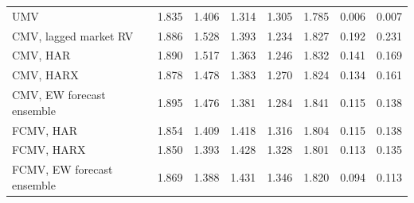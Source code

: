 \begin{table}[htbp]
\begin{tabular}{lrrrrrrr}
\hline
UMV & 1.835 & 1.406 & 1.314 & 1.305 & 1.785 & 0.006 & 0.007 \\
CMV, lagged market RV & 1.886 & 1.528 & 1.393 & 1.234 & 1.827 & 0.192 & 0.231 \\
CMV, HAR & 1.890 & 1.517 & 1.363 & 1.246 & 1.832 & 0.141 & 0.169 \\
CMV, HARX & 1.878 & 1.478 & 1.383 & 1.270 & 1.824 & 0.134 & 0.161 \\
CMV, EW forecast ensemble & 1.895 & 1.476 & 1.381 & 1.284 & 1.841 & 0.115 & 0.138 \\
FCMV, HAR & 1.854 & 1.409 & 1.418 & 1.316 & 1.804 & 0.115 & 0.138 \\
FCMV, HARX & 1.850 & 1.393 & 1.428 & 1.328 & 1.801 & 0.113 & 0.135 \\
FCMV, EW forecast ensemble & 1.869 & 1.388 & 1.431 & 1.346 & 1.820 & 0.094 & 0.113 \\
\hline
\end{tabular}
\end{table}
